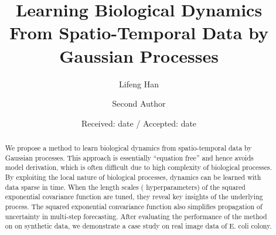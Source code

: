 \documentclass[smallextended,natbib]{svjour3}       %
\begin{document}
\title{Learning Biological Dynamics From Spatio-Temporal Data by Gaussian Processes%
}


\author{Lifeng Han         \and
        Second Author %
}



\date{Received: date / Accepted: date}


\maketitle

\begin{abstract}
We propose a method to learn biological dynamics from spatio-temporal data by Gaussian processes. This approach is essentially ``equation free'' and hence avoids model derivation, which is often difficult due to high complexity of biological processes. By exploiting the local nature of biological processes, dynamics can be learned with data sparse in time. When the length scales ( hyperparameters) of the squared exponential covariance function are tuned, they reveal key insights of the underlying process. The squared exponential convariance function also simplifies propagation of uncertainty in multi-step forecasting. After evaluating the performance of the method on on synthetic data, we demonstrate a case study on real image data of E. coli colony.  
\end{abstract}
\end{document}
